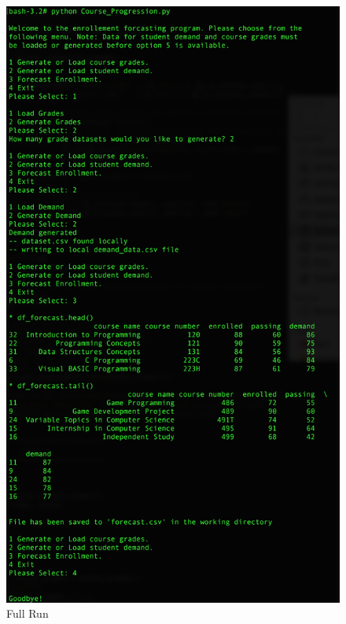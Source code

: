 \documentclass[12pt]{article}
\begin{document}
\begin{figure}[h]
    \centering
    \includegraphics[scale=0.60]{fullrun}
    \caption{Full Run}
    \label{fig:fig3}
\end{figure}


\end{document}
